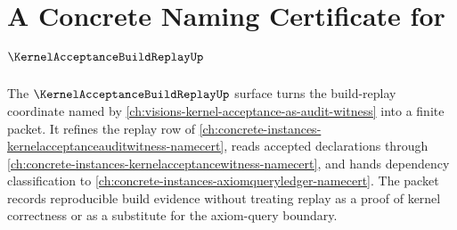 \chapter{A Concrete Naming Certificate for $\KernelAcceptanceBuildReplayUp$}
\label{ch:concrete-instances-kernel-acceptance-build-replay-namecert}

The $\KernelAcceptanceBuildReplayUp$ surface turns the build-replay coordinate named by \autoref{ch:visions-kernel-acceptance-as-audit-witness} into a finite \NameCert{} packet. It refines the replay row of \autoref{ch:concrete-instances-kernelacceptanceauditwitness-namecert}, reads accepted declarations through \autoref{ch:concrete-instances-kernelacceptancewitness-namecert}, and hands dependency classification to \autoref{ch:concrete-instances-axiomqueryledger-namecert}. The packet records reproducible build evidence without treating replay as a proof of kernel correctness or as a substitute for the axiom-query boundary.

